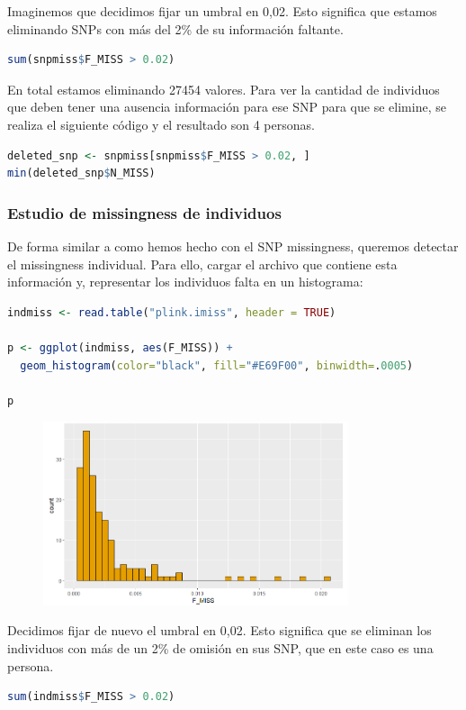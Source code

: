 Imaginemos que decidimos fijar un umbral en 0,02. Esto significa que estamos eliminando SNPs con más del 2\% de su información faltante.
\begin{lstlisting}[language=R]
sum(snpmiss$F_MISS > 0.02)
\end{lstlisting}

En total estamos eliminando 27454 valores. Para ver la cantidad de individuos que deben tener una ausencia información para ese SNP para que se elimine, se realiza el siguiente código y el resultado son 4 personas.
\begin{lstlisting}[language=R]
deleted_snp <- snpmiss[snpmiss$F_MISS > 0.02, ]
min(deleted_snp$N_MISS)
\end{lstlisting}

\subsubsection{Estudio de missingness de individuos}
De forma similar a como hemos hecho con el SNP missingness, queremos detectar el missingness individual. Para ello, cargar el archivo que contiene esta información y, representar los individuos falta en un histograma:
\begin{lstlisting}[language=R]
indmiss <- read.table("plink.imiss", header = TRUE)

p <- ggplot(indmiss, aes(F_MISS)) +
  geom_histogram(color="black", fill="#E69F00", binwidth=.0005)

p
\end{lstlisting}

\begin{figure}[htbp]
\centering
\includegraphics[width = 0.8\textwidth]{figs/hist-indmiss.png}
\end{figure}

Decidimos fijar de nuevo el umbral en 0,02. Esto significa que se eliminan los individuos con más de un 2\% de omisión en sus SNP, que en este caso es una persona.
\begin{lstlisting}[language=R]
sum(indmiss$F_MISS > 0.02)
\end{lstlisting}

